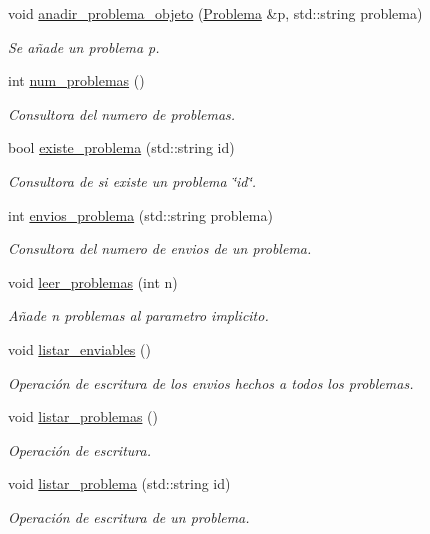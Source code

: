 \begin{DoxyCompactItemize}
void \mbox{\hyperlink{class_cjt__problema_ada9dc37cd22fd8065c89ef3f180beac5}{anadir\+\_\+problema\+\_\+objeto}} (\mbox{\hyperlink{class_problema}{Problema}} \&p, std\+::string problema)
\begin{DoxyCompactList}\small\item\em Se añade un problema p. \end{DoxyCompactList}\item 
int \mbox{\hyperlink{class_cjt__problema_acf0fca6955f991a9debb4ef50ece8905}{num\+\_\+problemas}} ()
\begin{DoxyCompactList}\small\item\em Consultora del numero de problemas. \end{DoxyCompactList}\item 
bool \mbox{\hyperlink{class_cjt__problema_a831be5b51e252520ee981b58d9ec00e9}{existe\+\_\+problema}} (std\+::string id)
\begin{DoxyCompactList}\small\item\em Consultora de si existe un problema \char`\"{}id\char`\"{}. \end{DoxyCompactList}\item 
int \mbox{\hyperlink{class_cjt__problema_a8d153df869b2918083eb9451d3a0ab6a}{envios\+\_\+problema}} (std\+::string problema)
\begin{DoxyCompactList}\small\item\em Consultora del numero de envios de un problema. \end{DoxyCompactList}\item 
void \mbox{\hyperlink{class_cjt__problema_afaff62599264105423f37fd1503cfb19}{leer\+\_\+problemas}} (int n)
\begin{DoxyCompactList}\small\item\em Añade n problemas al parametro implicito. \end{DoxyCompactList}\item 
void \mbox{\hyperlink{class_cjt__problema_a9f5508bb9d73918c4c99c6218315f168}{listar\+\_\+enviables}} ()
\begin{DoxyCompactList}\small\item\em Operación de escritura de los envios hechos a todos los problemas. \end{DoxyCompactList}\item 
void \mbox{\hyperlink{class_cjt__problema_a4966292b86b69ab0fef01154e79aeb54}{listar\+\_\+problemas}} ()
\begin{DoxyCompactList}\small\item\em Operación de escritura. \end{DoxyCompactList}\item 
void \mbox{\hyperlink{class_cjt__problema_a72e742fbaa5618065f2e478b59bf3036}{listar\+\_\+problema}} (std\+::string id)
\begin{DoxyCompactList}\small\item\em Operación de escritura de un problema. \end{DoxyCompactList}\end{DoxyCompactItemize}
